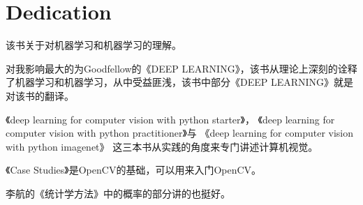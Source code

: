 \chapter*{Dedication}
该书关于对机器学习和机器学习的理解。

对我影响最大的为Goodfellow的《DEEP LEARNING》，该书从理论上深刻的诠释了机器学习和机器学习，从中受益匪浅，该书中部分《DEEP LEARNING》就是对该书的翻译。

《deep learning for computer vision with python starter》，
《deep learning for computer vision with python practitioner》与
《deep learning for computer vision with python imagenet》
这三本书从实践的角度来专门讲述计算机视觉。

《Case Studies》是OpenCV的基础，可以用来入门OpenCV。

李航的《统计学方法》中的概率的部分讲的也挺好。




